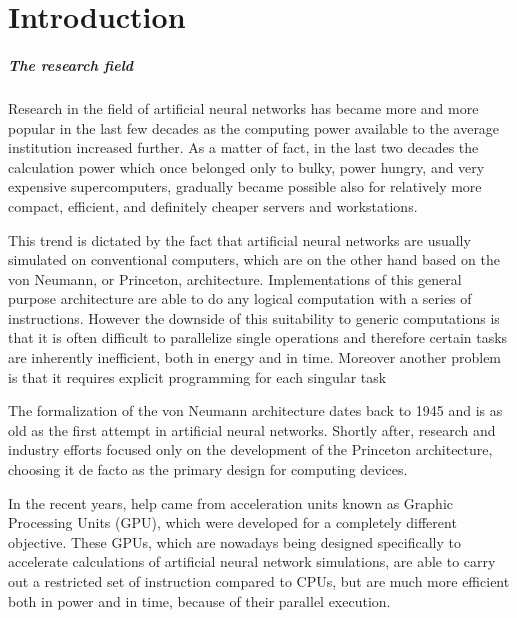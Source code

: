 \chapter*{Introduction}

\paragraph{The research field\\}
Research in the field of artificial neural networks has became more and more popular in the last few decades as the computing power available to the average institution increased further.
As a matter of fact, in the last two decades the calculation power which once belonged only to bulky, power hungry, and very expensive supercomputers, gradually became possible also for relatively more compact, efficient, and definitely cheaper servers and workstations.

This trend is dictated by the fact that artificial neural networks are usually simulated on conventional computers, which are on the other hand based on the von Neumann, or Princeton, architecture.
Implementations of this general purpose architecture are able to do any logical computation with a series of instructions.
However the downside of this suitability to generic computations is that it is often difficult to parallelize single operations and therefore certain tasks are inherently inefficient, both in energy and in time.
Moreover another problem is that it requires explicit programming for each singular task

The formalization of the von Neumann architecture dates back to 1945 and is as old as the first attempt in artificial neural networks.
Shortly after, research and industry efforts focused only on the development of the Princeton architecture, choosing it de facto as the primary design for computing devices.

In the recent years, help came from acceleration units known as Graphic Processing Units (GPU), which were developed for a completely different objective.
These GPUs, which are nowadays being designed specifically to accelerate calculations of artificial neural network simulations, are able to carry out a restricted set of instruction compared to CPUs, but are much more efficient both in power and in time, because of their parallel execution.

